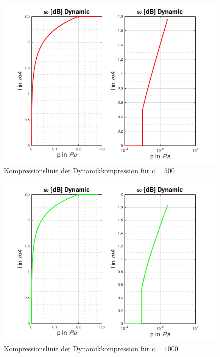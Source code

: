 \documentclass[
a4paper, 
12pt, 
]{article}
\begin{document}
\begin{figure}[h]
\centering
\includegraphics[width=0.6\linewidth]{Plots/c2_500}
\caption{Kompressionslinie der Dynamikkompression für $c = 500$}
\label{fig:c2_500}
\end{figure}

\begin{figure}[h]
\centering
\includegraphics[width=0.6\linewidth]{Plots/c2_1000}
\caption{Kompressionslinie der Dynamikkompression für $c = 1000$}
\label{fig:c2_1000}
\end{figure}
\end{document}
